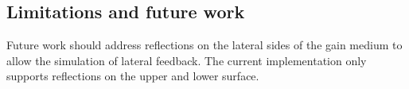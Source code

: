 \subsection{Limitations and future work}
\label{subsec:limitations}
Future work should address reflections on the lateral sides of the gain medium
to allow the simulation of lateral feedback. The current implementation only
supports reflections on the upper and lower surface.
